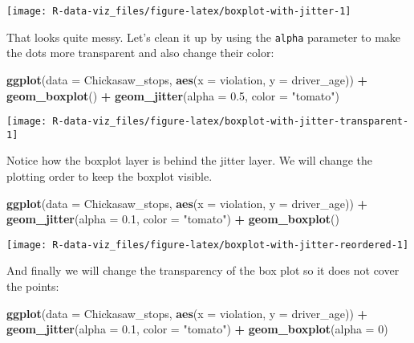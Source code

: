 \documentclass[]{book}
\newenvironment{Shaded}{\begin{snugshade}}{\end{snugshade}}
\newcommand{\DataTypeTok}[1]{\textcolor[rgb]{0.13,0.29,0.53}{#1}}
\newcommand{\DecValTok}[1]{\textcolor[rgb]{0.00,0.00,0.81}{#1}}
\newcommand{\FloatTok}[1]{\textcolor[rgb]{0.00,0.00,0.81}{#1}}
\newcommand{\KeywordTok}[1]{\textcolor[rgb]{0.13,0.29,0.53}{\textbf{#1}}}
\newcommand{\NormalTok}[1]{#1}
\newcommand{\OperatorTok}[1]{\textcolor[rgb]{0.81,0.36,0.00}{\textbf{#1}}}
\newcommand{\StringTok}[1]{\textcolor[rgb]{0.31,0.60,0.02}{#1}}
\begin{document}
\texttt{[image: R-data-viz\_files/figure-latex/boxplot-with-jitter-1]}

That looks quite messy. Let's clean it up by using the \texttt{alpha} parameter to make the dots more transparent and also change their color:

\begin{Shaded}
\begin{Highlighting}[]
\KeywordTok{ggplot}\NormalTok{(}\DataTypeTok{data =}\NormalTok{ Chickasaw_stops, }\KeywordTok{aes}\NormalTok{(}\DataTypeTok{x =}\NormalTok{ violation, }\DataTypeTok{y =}\NormalTok{ driver_age)) }\OperatorTok{+}
\StringTok{    }\KeywordTok{geom_boxplot}\NormalTok{() }\OperatorTok{+}
\StringTok{    }\KeywordTok{geom_jitter}\NormalTok{(}\DataTypeTok{alpha =} \FloatTok{0.5}\NormalTok{, }\DataTypeTok{color =} \StringTok{"tomato"}\NormalTok{)}
\end{Highlighting}
\end{Shaded}

\texttt{[image: R-data-viz\_files/figure-latex/boxplot-with-jitter-transparent-1]}

Notice how the boxplot layer is behind the jitter layer. We will change the plotting order to keep the boxplot visible.

\begin{Shaded}
\begin{Highlighting}[]
\KeywordTok{ggplot}\NormalTok{(}\DataTypeTok{data =}\NormalTok{ Chickasaw_stops, }\KeywordTok{aes}\NormalTok{(}\DataTypeTok{x =}\NormalTok{ violation, }\DataTypeTok{y =}\NormalTok{ driver_age)) }\OperatorTok{+}
\StringTok{    }\KeywordTok{geom_jitter}\NormalTok{(}\DataTypeTok{alpha =} \FloatTok{0.1}\NormalTok{, }\DataTypeTok{color =} \StringTok{"tomato"}\NormalTok{) }\OperatorTok{+}\StringTok{ }
\StringTok{    }\KeywordTok{geom_boxplot}\NormalTok{()}
\end{Highlighting}
\end{Shaded}

\texttt{[image: R-data-viz\_files/figure-latex/boxplot-with-jitter-reordered-1]}

And finally we will change the transparency of the box plot so it does not cover the points:

\begin{Shaded}
\begin{Highlighting}[]
\KeywordTok{ggplot}\NormalTok{(}\DataTypeTok{data =}\NormalTok{ Chickasaw_stops, }\KeywordTok{aes}\NormalTok{(}\DataTypeTok{x =}\NormalTok{ violation, }\DataTypeTok{y =}\NormalTok{ driver_age)) }\OperatorTok{+}
\StringTok{    }\KeywordTok{geom_jitter}\NormalTok{(}\DataTypeTok{alpha =} \FloatTok{0.1}\NormalTok{, }\DataTypeTok{color =} \StringTok{"tomato"}\NormalTok{) }\OperatorTok{+}
\StringTok{    }\KeywordTok{geom_boxplot}\NormalTok{(}\DataTypeTok{alpha =} \DecValTok{0}\NormalTok{)  }
\end{Highlighting}
\end{Shaded}
\end{document}

